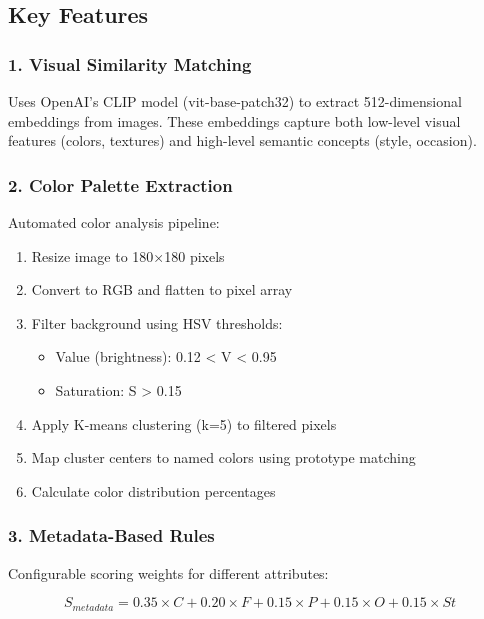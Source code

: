 \documentclass[12pt,a4paper]{report}
\begin{document}
\subsection{Key Features}

\subsubsection{1. Visual Similarity Matching}

Uses OpenAI's CLIP model (vit-base-patch32) to extract 512-dimensional embeddings from images. These embeddings capture both low-level visual features (colors, textures) and high-level semantic concepts (style, occasion).

\subsubsection{2. Color Palette Extraction}

Automated color analysis pipeline:
\begin{enumerate}
    \item Resize image to 180×180 pixels
    \item Convert to RGB and flatten to pixel array
    \item Filter background using HSV thresholds:
    \begin{itemize}
        \item Value (brightness): 0.12 < V < 0.95
        \item Saturation: S > 0.15
    \end{itemize}
    \item Apply K-means clustering (k=5) to filtered pixels
    \item Map cluster centers to named colors using prototype matching
    \item Calculate color distribution percentages
\end{enumerate}

\subsubsection{3. Metadata-Based Rules}

Configurable scoring weights for different attributes:

\begin{equation}
S_{metadata} = 0.35 \times C + 0.20 \times F + 0.15 \times P + 0.15 \times O + 0.15 \times St
\end{equation}
\end{document}
